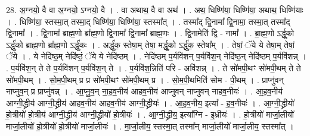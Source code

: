 \documentclass[17pt]{extarticle}
\begin{document}
28. अ॒ग्नयो॒ वै वा अ॒ग्नयो॒ ऽग्नयो॒ वै । . वा अथाथ॒ वै वा अथ॑ । . अथ॒ धिष्णि॑या॒ धिष्णि॑या॒ अथाथ॒ धिष्णि॑याः । . धिष्णि॑या॒ स्तस्मा॒त् तस्मा॒द् धिष्णि॑या॒ धिष्णि॑या॒ स्तस्मा᳚त् । . तस्मा᳚द् द्वि॒नामा᳚ द्वि॒नामा॒ तस्मा॒त् तस्मा᳚द् द्वि॒नामा᳚ । . द्वि॒नामा᳚ ब्राह्म॒णो ब्रा᳚ह्म॒णो द्वि॒नामा᳚ द्वि॒नामा᳚ ब्राह्म॒णः । . द्वि॒नामेति॑ द्वि - नामा᳚ । . ब्रा॒ह्म॒णो ऽर्द्धु॒को ऽर्द्धु॑को ब्राह्म॒णो ब्रा᳚ह्म॒णो ऽर्द्धु॑कः । . अर्द्धु॑क॒ स्तेषा॒म् तेषा॒ मर्द्धु॒को ऽर्द्धु॑क॒ स्तेषा᳚म् । . तेषां॒ ॅये ये तेषा॒म् तेषां॒ ॅये । . ये नेदि॑ष्ठ॒म् नेदि॑ष्ठं॒ ॅये ये नेदि॑ष्ठम् । . नेदि॑ष्ठम् प॒र्यवि॑शन् प॒र्यवि॑श॒न् नेदि॑ष्ठ॒न् नेदि॑ष्ठम् प॒र्यवि॑शन्न् । . प॒र्यवि॑श॒न् ते ते प॒र्यवि॑शन् प॒र्यवि॑श॒न् ते । . प॒र्यवि॑श॒न्निति॑ परि - अवि॑शन्न् । . ते सो॑मपी॒थꣳ सो॑मपी॒थम् ते ते सो॑मपी॒थम् । . सो॒म॒पी॒थम् प्र प्र सो॑मपी॒थꣳ सो॑मपी॒थम् प्र । . सो॒म॒पी॒थमिति॑ सोम - पी॒थम् । . प्राप्नु॑वन् नाप्नुव॒न् प्र प्राप्नु॑वन्न् । . आ॒प्नु॒व॒न् ना॒ह॒व॒नीय॑ आहव॒नीय॑ आप्नुवन् नाप्नुवन् नाहव॒नीयः॑ । . आ॒ह॒व॒नीय॑ आग्नी॒द्ध्रीय॑ आग्नी॒द्ध्रीय॑ आहव॒नीय॑ आहव॒नीय॑ आग्नी॒द्ध्रीयः॑ । . आ॒ह॒व॒नीय॒ इत्या᳚ - ह॒व॒नीयः॑ । . आ॒ग्नी॒द्ध्रीयो॑ हो॒त्रीयो॑ हो॒त्रीय॑ आग्नी॒द्ध्रीय॑ आग्नी॒द्ध्रीयो॑ हो॒त्रीयः॑ । . आ॒ग्नी॒द्ध्रीय॒ इत्या᳚ग्नि - इ॒ध्रीयः॑ । . हो॒त्रीयो॑ मार्जा॒लीयो॑ मार्जा॒लीयो॑ हो॒त्रीयो॑ हो॒त्रीयो॑ मार्जा॒लीयः॑ । . मा॒र्जा॒लीय॒ स्तस्मा॒त् तस्मा᳚न् मार्जा॒लीयो॑ मार्जा॒लीय॒ स्तस्मा᳚त् । \newline
\end{document}
